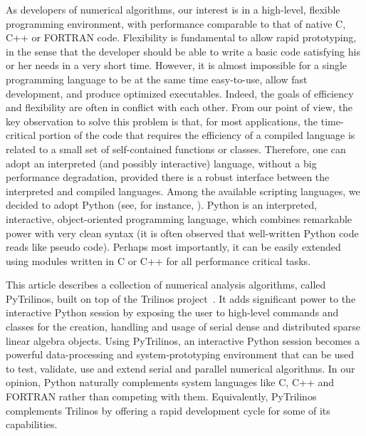 \documentclass[10pt,relax]{SANDreport}
\newcommand{\PyTrilinos}{{PyTrilinos}}
\begin{document}
As developers of numerical algorithms,
our interest is in a high-level, flexible programming environment,
with performance comparable to that of native C, C++ or FORTRAN
code. Flexibility is fundamental to allow rapid prototyping, in the
sense that the developer should be able to write a basic code
satisfying his or her needs in a very short time.  However, it is
almost impossible for a single programming language to be at the same
time easy-to-use, allow fast development, and produce optimized
executables. Indeed, the goals of efficiency and flexibility are often
in conflict with each other.
From our point of view, the key observation to solve this problem is that, for most
applications, the time-critical portion of the code that requires the
efficiency of a compiled language is related to a small set of
self-contained functions or classes. Therefore, one can adopt an
interpreted (and possibly interactive) language, without a big
performance degradation, provided there is a robust interface between
the interpreted and compiled languages. Among the available scripting
languages, we decided to adopt Python 
(see, for instance, \cite{python-book}).  Python
is an interpreted, interactive, object-oriented programming
language, which combines remarkable power with very clean syntax (it
is often observed that well-written Python code reads like pseudo
code).  Perhaps most importantly, it can be easily extended using
modules written in C or C++ for all performance critical tasks.

This article describes a collection of numerical analysis algorithms, called
PyTrilinos, 
built on top of the Trilinos
project~\cite{Trilinos-home-page,Heroux:2005:OTP}.  It adds significant power
to the interactive Python session by exposing the user to high-level commands
and classes for the creation, handling and usage of serial dense and
distributed sparse linear algebra objects. Using \PyTrilinos, an interactive
Python session becomes a powerful data-processing and system-prototyping
environment that can be used to test, validate, use
and extend serial and parallel numerical algorithms.
In our opinion, Python naturally complements
system languages like C, C++ and FORTRAN rather than competing with
them. Equivalently, PyTrilinos complements Trilinos by offering a rapid
development cycle for some of its capabilities.

\end{document}
